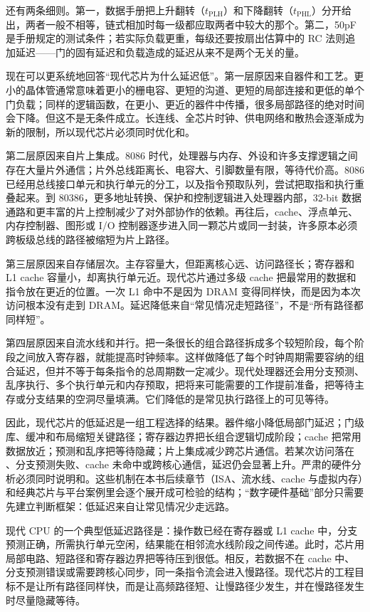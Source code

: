 还有两条细则。第一，数据手册把上升翻转（$t_\mathrm{PLH}$）和下降翻转（$t_\mathrm{PHL}$）分开给出，两者一般不相等，链式相加时每一级都应取两者中较大的那个。第二，50pF 是手册规定的测试条件；若实际负载更重，每级还要按扇出估算中的 RC 法则追加延迟——门的固有延迟和负载造成的延迟从来不是两个无关的量。

现在可以更系统地回答“现代芯片为什么延迟低”。第一层原因来自器件和工艺。更小的晶体管通常意味着更小的栅电容、更短的沟道、更短的局部连接和更低的单个门负载；同样的逻辑函数，在更小、更近的器件中传播，很多局部路径的绝对时间会下降。但这不是无条件成立。长连线、全芯片时钟、供电网络和散热会逐渐成为新的限制，所以现代芯片必须同时优化和。

第二层原因来自片上集成。8086 时代，处理器与内存、外设和许多支撑逻辑之间存在大量片外通信；片外总线距离长、电容大、引脚数量有限，等待代价高。8086 已经用总线接口单元和执行单元的分工，以及指令预取队列，尝试把取指和执行重叠起来。到 80386，更多地址转换、保护和控制逻辑进入处理器内部，32-bit 数据通路和更丰富的片上控制减少了对外部协作的依赖。再往后，cache、浮点单元、内存控制器、图形或 I/O 控制器逐步进入同一颗芯片或同一封装，许多原本必须跨板级总线的路径被缩短为片上路径。

第三层原因来自存储层次。主存容量大，但距离核心远、访问路径长；寄存器和 L1 cache 容量小，却离执行单元近。现代芯片通过多级 cache 把最常用的数据和指令放在更近的位置。一次 L1 命中不是因为 DRAM 变得同样快，而是因为本次访问根本没有走到 DRAM。延迟降低来自“常见情况走短路径”，不是“所有路径都同样短”。

第四层原因来自流水线和并行。把一条很长的组合路径拆成多个较短阶段，每个阶段之间放入寄存器，就能提高时钟频率。这样做降低了每个时钟周期需要容纳的组合延迟，但并不等于每条指令的总周期数一定减少。现代处理器还会用分支预测、乱序执行、多个执行单元和内存预取，把将来可能需要的工作提前准备，把等待主存或分支结果的空洞尽量填满。它们降低的是常见执行路径上的可见等待。

因此，现代芯片的低延迟是一组工程选择的结果。器件缩小降低局部门延迟；门级库、缓冲和布局缩短关键路径；寄存器边界把长组合逻辑切成阶段；cache 把常用数据放近；预测和乱序把等待隐藏；片上集成减少跨芯片通信。若某次访问落在 、分支预测失败、cache 未命中或跨核心通信，延迟仍会显著上升。严肃的硬件分析必须同时说明和。这些机制在本书后续章节（ISA、流水线、cache 与虚拟内存）和经典芯片与平台案例里会逐个展开成可检验的结构；“数字硬件基础”部分只需要先建立判断框架：低延迟来自让常见情况少走远路。

\begin{chipcase}
现代 CPU 的一个典型低延迟路径是：操作数已经在寄存器或 L1 cache 中，分支预测正确，所需执行单元空闲，结果能在相邻流水线阶段之间传递。此时，芯片用局部电路、短路径和寄存器边界把等待压到很低。相反，若数据不在 cache 中、分支预测错误或需要跨核心同步，同一条指令流会进入慢路径。现代芯片的工程目标不是让所有路径同样快，而是让高频路径短、让慢路径少发生，并在慢路径发生时尽量隐藏等待。
\end{chipcase}

